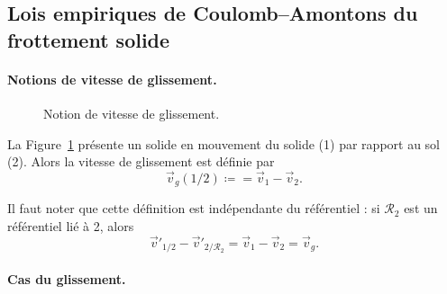     \subsection{Lois empiriques de Coulomb--Amontons du frottement solide}

        \paragraph{Notions de vitesse de glissement.}

            \begin{figure}
                \centering
                \caption{Notion de vitesse de glissement.}    
                \label{fig:notion_vitesse_glissement}
            \end{figure}

            La Figure~\ref{fig:notion_vitesse_glissement} présente un solide en mouvement du solide (1) par rapport au sol (2). Alors la vitesse de glissement est définie par 
            \begin{equation*}
                \vec{v}_g(1/2)\coloneqq =\vec{v}_1-\vec{v}_2.
            \end{equation*}

            Il faut noter que cette définition est indépendante du référentiel : si $\mathcal{R}_2$ est un référentiel lié à 2, alors 
            \begin{equation*}
                \vec{v}'_{1/2}-\vec{v}'_{2/\mathcal{R}_2}=\vec{v}_1-\vec{v}_2=\vec{v}_g.
            \end{equation*}

        \paragraph{Cas du glissement.} 
            
